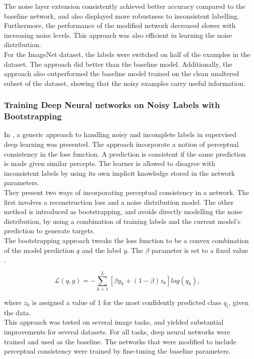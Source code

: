 The noise layer extension consistently achieved better accuracy compared to the baseline network, and also displayed more robustness to inconsistent labelling. Furthermore, the performance of the modified network decreased slower with increasing noise levels. This approach was also efficient in learning the noise distribution. \\

For the ImageNet dataset, the labels were switched on half of the examples in the dataset. The approach did better than the baseline model. Additionally, the approach also outperformed the baseline model trained on the clean unaltered subset of the dataset, showing that the noisy examples carry useful information.


\subsubsection{Training Deep Neural networks on Noisy Labels with Bootstrapping}
In \cite{Reed_noisy_labels_bootstrapping}, a generic approach to handling noisy and incomplete labels in supervised deep learning was presented. The approach incorporate a notion of perceptual consistency in the loss function. A prediction is consistent if the same prediction is made given similar percepts. The learner is allowed to disagree with inconsistent labels by using its own implicit knowledge stored in the network parameters.\\ 

They present two ways of incorporating perceptual consistency in a network. The first involves a reconstruction loss and a noise distribution model. The other method is introduced as bootstrapping, and avoids directly modelling the noise distribution, by using a combination of training labels and the current model's prediction to generate targets.\\

The bootstrapping approach tweaks the loss function to be a convex combination of the model prediction $q$ and the label $y$. The $\beta$ parameter is set to a fixed value .

$$\mathcal{L}(q,y) = - \sum\limits_{k=1}^L [\beta y_k + (1-\beta)z_k]log(q_k),$$

where $z_k$ is assigned a value of 1 for the most confidently predicted class $q_i$, given the data. \\

This approach was tested on several image tasks, and yielded substantial improvements for several datasets. For all tasks, deep neural networks were trained and used as the baseline. The networks that were modified to include perceptual consistency were trained by fine-tuning the baseline parameters. \\

